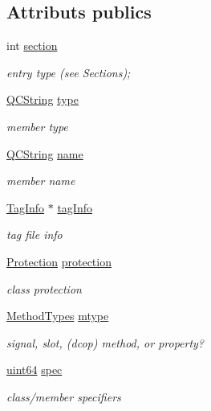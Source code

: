 \subsection*{Attributs publics}
\begin{DoxyCompactItemize}
\item 
int \hyperlink{class_entry_a9197cdd8acd8fc0670e2911a407f3d04}{section}
\begin{DoxyCompactList}\small\item\em entry type (see Sections); \end{DoxyCompactList}\item 
\hyperlink{class_q_c_string}{Q\+C\+String} \hyperlink{class_entry_a79a9b5736630c3769e645f71dc357b9f}{type}
\begin{DoxyCompactList}\small\item\em member type \end{DoxyCompactList}\item 
\hyperlink{class_q_c_string}{Q\+C\+String} \hyperlink{class_entry_a87d6afbe10ea84859ef03b6f046e34d3}{name}
\begin{DoxyCompactList}\small\item\em member name \end{DoxyCompactList}\item 
\hyperlink{struct_tag_info}{Tag\+Info} $\ast$ \hyperlink{class_entry_a0e6301ae1fd7d56d928e1ef7672d4ede}{tag\+Info}
\begin{DoxyCompactList}\small\item\em tag file info \end{DoxyCompactList}\item 
\hyperlink{types_8h_a90e352184df58cd09455fe9996cd4ded}{Protection} \hyperlink{class_entry_acbb1b4e99978a710863cf9cab6c90553}{protection}
\begin{DoxyCompactList}\small\item\em class protection \end{DoxyCompactList}\item 
\hyperlink{types_8h_a0872178db42722c310fe6117189ed441}{Method\+Types} \hyperlink{class_entry_a4669c5294781bce55ce0ad654460acbd}{mtype}
\begin{DoxyCompactList}\small\item\em signal, slot, (dcop) method, or property? \end{DoxyCompactList}\item 
\hyperlink{qglobal_8h_a29940ae63ec06c9998bba873e25407ad}{uint64} \hyperlink{class_entry_a3019e7d39a5c382fb924e22913198133}{spec}
\begin{DoxyCompactList}\small\item\em class/member specifiers \end{DoxyCompactList}\item 

\end{DoxyCompactItemize}
